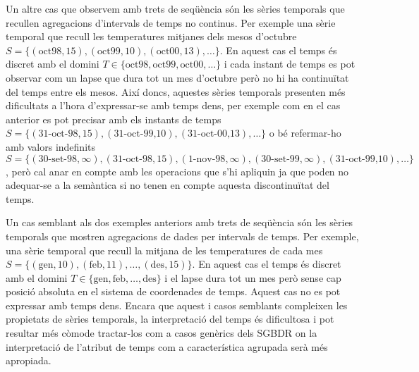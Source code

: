 \begin{example}
  Un altre cas que observem amb trets de seqüència són les sèries
  temporals que recullen agregacions d'intervals de temps no continus.
  Per exemple una sèrie temporal que recull les temperatures mitjanes
  dels mesos d'octubre
  $S=\{(\text{oct98},15),(\text{oct99},10),(\text{oct00},13),\dotsc\}$.
  En aquest cas el temps és discret amb el domini
  $T\in\{\text{oct98},\text{oct99},\text{oct00},\dotsc\}$ i cada
  instant de temps es pot observar com un lapse que dura tot un mes
  d'octubre però no hi ha continuïtat del temps entre els mesos. Així
  doncs, aquestes sèries temporals presenten més dificultats a l'hora
  d'expressar-se amb temps dens, per exemple com en el cas anterior es
  pot precisar amb els instants de temps
  $S=\{(\text{31-oct-98},15),(\text{31-oct-99,10}),(\text{31-oct-00,13}),\dotsc\}$
  o bé refermar-ho amb valors indefinits
  $S=\{(\text{30-set-98},\infty),(\text{31-oct-98},15),(\text{1-nov-98},\infty),(\text{30-set-99},\infty),(\text{31-oct-99,10}),\dotsc\}$,
  però cal anar en compte amb les operacions que s'hi apliquin ja que
  poden no adequar-se a la semàntica si no tenen en compte aquesta
  discontinuïtat del temps.
\end{example}


\begin{example}
  Un cas semblant als dos exemples anteriors amb trets de seqüència
  són les sèries temporals que mostren agregacions de dades per
  intervals de temps. Per exemple, una sèrie temporal que recull la
  mitjana de les temperatures de cada mes
  $S=\{(\text{gen},10),(\text{feb},11),\dotsc,(\text{des},15)\}$. En
  aquest cas el temps és discret amb el domini
  $T\in\{\text{gen},\text{feb},\dotsc,\text{des}\}$ i el lapse dura
  tot un mes però sense cap posició absoluta en el sistema de
  coordenades de temps. Aquest cas no es pot expressar amb temps dens.
  Encara que aquest i casos semblants compleixen les propietats de
  sèries temporals, la interpretació del temps és dificultosa i pot
  resultar més còmode tractar-los com a casos genèrics dels
  \gls{SGBDR} on la interpretació de l'atribut de temps com a
  característica agrupada serà més apropiada.
\end{example}




